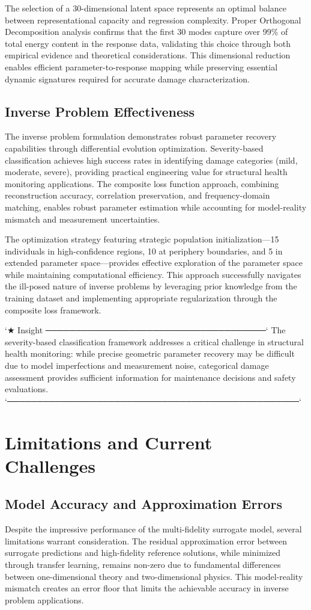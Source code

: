 The selection of a 30-dimensional latent space represents an optimal balance between representational capacity and regression complexity. Proper Orthogonal Decomposition analysis confirms that the first 30 modes capture over 99\% of total energy content in the response data, validating this choice through both empirical evidence and theoretical considerations. This dimensional reduction enables efficient parameter-to-response mapping while preserving essential dynamic signatures required for accurate damage characterization.

\subsection{Inverse Problem Effectiveness}
The inverse problem formulation demonstrates robust parameter recovery capabilities through differential evolution optimization. Severity-based classification achieves high success rates in identifying damage categories (mild, moderate, severe), providing practical engineering value for structural health monitoring applications. The composite loss function approach, combining reconstruction accuracy, correlation preservation, and frequency-domain matching, enables robust parameter estimation while accounting for model-reality mismatch and measurement uncertainties.

The optimization strategy featuring strategic population initialization—15 individuals in high-confidence regions, 10 at periphery boundaries, and 5 in extended parameter space—provides effective exploration of the parameter space while maintaining computational efficiency. This approach successfully navigates the ill-posed nature of inverse problems by leveraging prior knowledge from the training dataset and implementing appropriate regularization through the composite loss framework.

`★ Insight ─────────────────────────────────────`
The severity-based classification framework addresses a critical challenge in structural health monitoring: while precise geometric parameter recovery may be difficult due to model imperfections and measurement noise, categorical damage assessment provides sufficient information for maintenance decisions and safety evaluations.
`─────────────────────────────────────────────────`

\section{Limitations and Current Challenges}
\subsection{Model Accuracy and Approximation Errors}
Despite the impressive performance of the multi-fidelity surrogate model, several limitations warrant consideration. The residual approximation error between surrogate predictions and high-fidelity reference solutions, while minimized through transfer learning, remains non-zero due to fundamental differences between one-dimensional theory and two-dimensional physics. This model-reality mismatch creates an error floor that limits the achievable accuracy in inverse problem applications.

